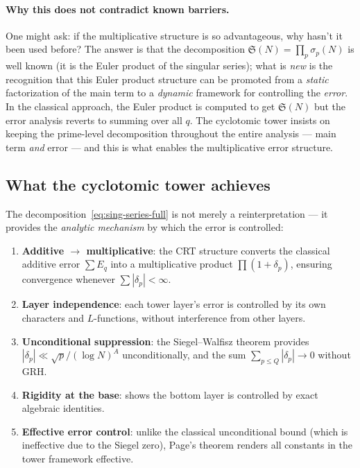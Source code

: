 \documentclass[11pt,a4paper]{article}
\theoremstyle{remark}
\begin{document}
\paragraph{Why this does not contradict known barriers.}
One might ask: if the multiplicative structure is so advantageous, why
hasn't it been used before?  The answer is that the decomposition
$\mathfrak{S}(N) = \prod_p \sigma_p(N)$ is well known (it is the Euler
product of the singular series); what is \emph{new} is the recognition
that this Euler product structure can be promoted from a \emph{static}
factorization of the main term to a \emph{dynamic} framework for
controlling the \emph{error}.  In the classical approach, the Euler
product is computed to get $\mathfrak{S}(N)$ but the error analysis
reverts to summing over all $q$.  The cyclotomic tower insists on
keeping the prime-level decomposition throughout the entire analysis ---
main term \emph{and} error --- and this is what enables the multiplicative
error structure.

\subsection{What the cyclotomic tower achieves}

The decomposition~\eqref{eq:sing-series-full} is not merely a
reinterpretation --- it provides the \emph{analytic mechanism} by which
the error is controlled:

\begin{enumerate}[nosep]
  \item \textbf{Additive $\to$ multiplicative}: the CRT structure
    converts the classical additive error $\sum E_q$ into a multiplicative
    product $\prod(1+\delta_p)$, ensuring convergence whenever
    $\sum|\delta_p| < \infty$.
  \item \textbf{Layer independence}: each tower layer's error is
    controlled by its own characters and $L$-functions, without
    interference from other layers.
  \item \textbf{Unconditional suppression}: the Siegel--Walfisz theorem
    provides $|\delta_p| \ll \sqrt{p}/(\log N)^A$ unconditionally, and
    the sum $\sum_{p \leq Q}|\delta_p| \to 0$ without GRH.
  \item \textbf{Rigidity at the base}:  shows the
    bottom layer is controlled by exact algebraic identities.
  \item \textbf{Effective error control}: unlike the classical
    unconditional bound (which is ineffective due to the Siegel zero),
    Page's theorem renders all constants in the tower framework
    effective.
\end{enumerate}
\end{document}
